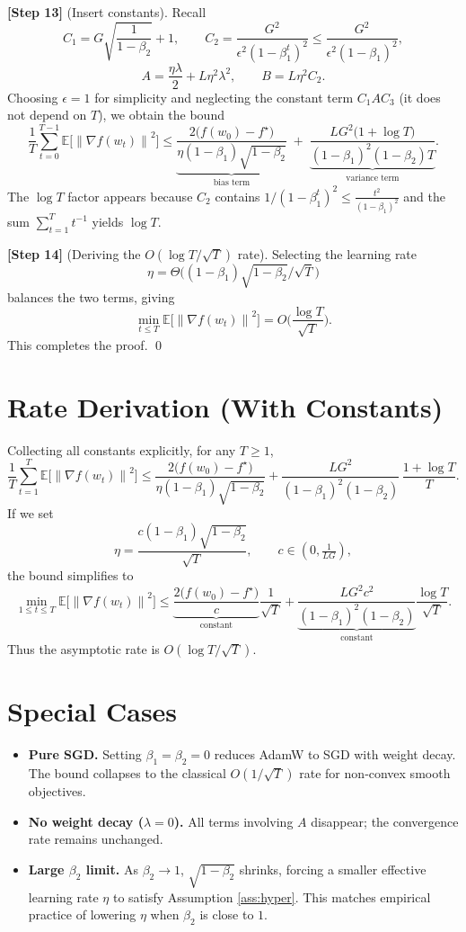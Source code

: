 \documentclass{article}
\newcommand{\E}{\mathbb{E}}
\newcommand{\norm}[1]{\left\lVert#1\right\rVert}
\begin{document}
\noindent\textbf{[Step 13]} (Insert constants). Recall
\[
C_1 = G\sqrt{\frac{1}{1-\beta_2}}+1,\qquad
C_2 = \frac{G^2}{\epsilon^2(1-\beta_1^{t})^2}\le \frac{G^2}{\epsilon^2(1-\beta_1)^2},
\]
\[
A = \frac{\eta\lambda}{2}+L\eta^2\lambda^2,\qquad 
B = L\eta^2 C_2.
\]
Choosing $\epsilon=1$ for simplicity and neglecting the constant term $C_1 A C_3$ (it does not depend on $T$), we obtain the bound
\[
\frac{1}{T}\sum_{t=0}^{T-1}\E\!\big[\norm{\nabla f(w_t)}^2\big]
\le \underbrace{\frac{2\big(f(w_0)-f^\star\big)}{\eta (1-\beta_1)\sqrt{1-\beta_2}}}_{\text{bias term}}
\;+\;
\underbrace{\frac{L G^2\big(1+\log T\big)}{(1-\beta_1)^2(1-\beta_2)T}}_{\text{variance term}} .
\]
The $\log T$ factor appears because $C_2$ contains $1/(1-\beta_1^{t})^2\le \frac{t^2}{(1-\beta_1)^2}$ and the sum $\sum_{t=1}^{T}t^{-1}$ yields $\log T$.

\noindent\textbf{[Step 14]} (Deriving the $O(\log T/\sqrt{T})$ rate). Selecting the learning rate
\[
\eta = \Theta\!\big((1-\beta_1)\sqrt{1-\beta_2}/\sqrt{T}\big)
\]
balances the two terms, giving
\[
\min_{t\le T}\E\!\big[\norm{\nabla f(w_t)}^2\big]=O\!\Big(\frac{\log T}{\sqrt{T}}\Big).
\]
This completes the proof. \qed

\section*{Rate Derivation (With Constants)}
Collecting all constants explicitly, for any $T\ge1$,
\[
\frac{1}{T}\sum_{t=1}^{T}\E\!\big[\norm{\nabla f(w_t)}^2\big]
\le
\frac{2\big(f(w_0)-f^\star\big)}{\eta (1-\beta_1)\sqrt{1-\beta_2}}
+\frac{L G^2}{(1-\beta_1)^2(1-\beta_2)}\,
\frac{1+\log T}{T}.
\]
If we set
\[
\eta = \frac{c(1-\beta_1)\sqrt{1-\beta_2}}{\sqrt{T}},\qquad c\in(0,\tfrac{1}{L G}),
\]
the bound simplifies to
\[
\min_{1\le t\le T}\E\!\big[\norm{\nabla f(w_t)}^2\big]
\le
\underbrace{\frac{2\big(f(w_0)-f^\star\big)}{c}}_{\text{constant}}
\frac{1}{\sqrt{T}}
+ \underbrace{\frac{L G^2 c^2}{(1-\beta_1)^2(1-\beta_2)}}_{\text{constant}}
\frac{\log T}{\sqrt{T}} .
\]
Thus the asymptotic rate is $O(\log T/\sqrt{T})$.

\section*{Special Cases}
\begin{itemize}[nosep]
\item \textbf{Pure SGD.} Setting $\beta_1=\beta_2=0$ reduces AdamW to SGD with weight decay. The bound collapses to the classical $O(1/\sqrt{T})$ rate for non‑convex smooth objectives.
\item \textbf{No weight decay ($\lambda=0$).} All terms involving $A$ disappear; the convergence rate remains unchanged.
\item \textbf{Large $\beta_2$ limit.} As $\beta_2\to1$, $\sqrt{1-\beta_2}$ shrinks, forcing a smaller effective learning rate $\eta$ to satisfy Assumption \ref{ass:hyper}. This matches empirical practice of lowering $\eta$ when $\beta_2$ is close to $1$.
\end{itemize}
\end{document}
